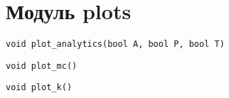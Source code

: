 \section{Модуль plots}

\begin{verbatim}
void plot_analytics(bool A, bool P, bool T)
\end{verbatim}

\begin{verbatim}
void plot_mc()
\end{verbatim}

\begin{verbatim}
void plot_k()
\end{verbatim}
